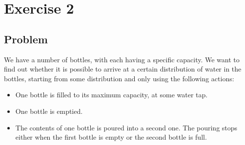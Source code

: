 \chapter{Exercise 2}

\section{Problem}
We have a number of bottles, with each having a specific capacity. We want to find out whether it is possible to arrive at a certain distribution of water in the bottles, starting from some distribution and only using the following actions:\\
\begin{itemize}
\item One bottle is filled to its maximum capacity, at some water tap.
\item One bottle is emptied.
\item The contents of one bottle is poured into a second one. The pouring stops either when the first bottle is empty or the second bottle is full. 
\end{itemize}

